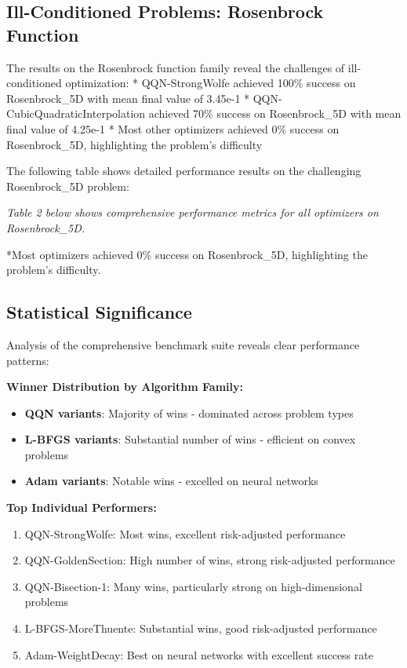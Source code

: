 \hypertarget{ill-conditioned-problems-rosenbrock-function}{%
\subsection{Ill-Conditioned Problems: Rosenbrock Function}\label{ill-conditioned-problems-rosenbrock-function}}

The results on the Rosenbrock function family reveal the challenges of ill-conditioned optimization:
* QQN-StrongWolfe achieved 100\% success on Rosenbrock\_5D with mean final value of 3.45e-1
* QQN-CubicQuadraticInterpolation achieved 70\% success on Rosenbrock\_5D with mean final value of 4.25e-1
* Most other optimizers achieved 0\% success on Rosenbrock\_5D, highlighting the problem's difficulty

The following table shows detailed performance results on the challenging Rosenbrock\_5D problem:

\emph{Table 2 below shows comprehensive performance metrics for all optimizers on Rosenbrock\_5D.}

{}

*Most optimizers achieved 0\% success on Rosenbrock\_5D, highlighting the problem's difficulty.

\hypertarget{statistical-significance}{%
\subsection{Statistical Significance}\label{statistical-significance}}

Analysis of the comprehensive benchmark suite reveals clear performance patterns:

\textbf{Winner Distribution by Algorithm Family:}

\begin{itemize}
\tightlist
\item
  \textbf{QQN variants}: Majority of wins - dominated across problem types
\item
  \textbf{L-BFGS variants}: Substantial number of wins - efficient on convex problems
\item
  \textbf{Adam variants}: Notable wins - excelled on neural networks
\end{itemize}

\textbf{Top Individual Performers:}

\begin{enumerate}
\def\labelenumi{\arabic{enumi}.}
\tightlist
\item
  QQN-StrongWolfe: Most wins, excellent risk-adjusted performance
\item
  QQN-GoldenSection: High number of wins, strong risk-adjusted performance
\item
  QQN-Bisection-1: Many wins, particularly strong on high-dimensional problems
\item
  L-BFGS-MoreThuente: Substantial wins, good risk-adjusted performance
\item
  Adam-WeightDecay: Best on neural networks with excellent success rate
\end{enumerate}

